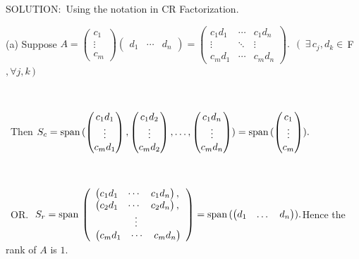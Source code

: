 \documentclass[a4paper, 11pt, UTF8]{article}
\def\Spn{\textup{span}\,}
\def\Fbfc{$\,{\timesbf F}$}
\begin{document}
\begin{large}
{\timesbf S\footnotesize{OLUTION:}}\,\,\,Using the notation in CR Factorization.\par\quad
(a) Suppose $A=\begin{pmatrix}c_1 \\ \vdots \\ c_m \end{pmatrix}\begin{pmatrix} d_1 & \cdots & d_n\end{pmatrix}=\begin{pmatrix} c_1 d_1 & \cdots & c_1 d_n\\ \vdots & \ddots & \vdots \\ c_m d_1 & \cdots & c_m d_n \end{pmatrix}.\,\,\,\,(\,\,\,\exists\,c_j,d_k\in\Fbfc,\forall j,k\,)$\par\,\par\qquad\,
Then $S_c=\Spn(\begin{pmatrix} c_1 d_1 \\ \vdots \\ c_m d_1\end{pmatrix},\begin{pmatrix} c_1 d_2 \\ \vdots \\ c_m d_2\end{pmatrix},\dots,\begin{pmatrix} c_1 d_n \\ \vdots \\ c_m d_n\end{pmatrix})=\Spn(\begin{pmatrix} c_1 \\ \vdots \\ c_m\end{pmatrix}).$\par\,\par\qquad\,
O{\small R.}\,\,\,\,$S_r=\Spn\left(\begin{array}{l}\begin{pmatrix} c_1 d_1 & \cdots & c_1 d_n\end{pmatrix},\\ \begin{pmatrix} c_2 d_1 & \cdots & c_2 d_n\end{pmatrix},\\ \qquad\qquad\vdots\\ \begin{pmatrix} c_m d_1 & \cdots & c_m d_n\end{pmatrix}\end{array}\right)=\Spn(\begin{pmatrix} d_1 & \dots & d_n\end{pmatrix}).$\qquad Hence the rank of $A$ is $1$.\par{\,}\par\quad

\end{large}
\end{document}

